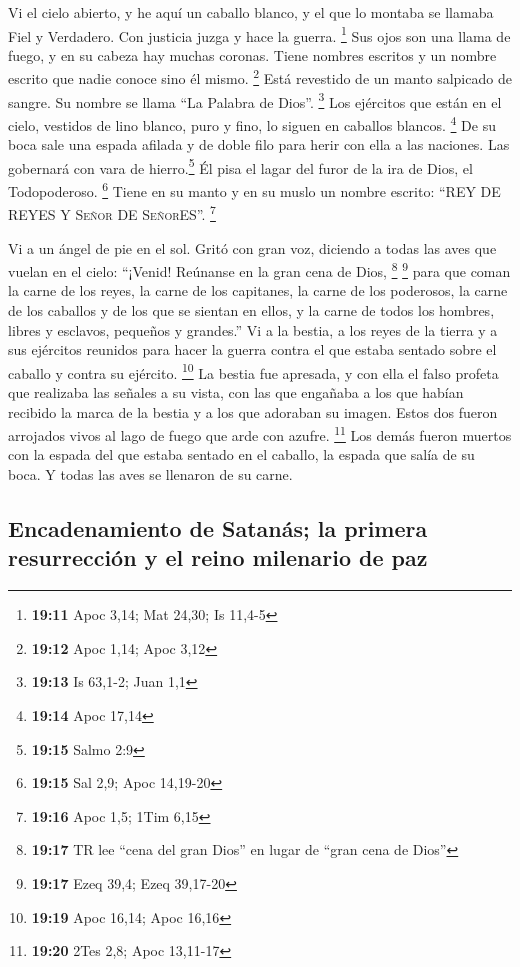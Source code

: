  Vi el cielo abierto, y he aquí un caballo blanco, y el
que lo montaba se llamaba Fiel y Verdadero. Con justicia juzga y hace la
guerra. \footnote{\textbf{19:11} Apoc 3,14; Mat 24,30; Is 11,4-5}
 Sus ojos son una llama de fuego, y en su cabeza hay
muchas coronas. Tiene nombres escritos y un nombre escrito que nadie
conoce sino él mismo. \footnote{\textbf{19:12} Apoc 1,14; Apoc 3,12}
 Está revestido de un manto salpicado de sangre. Su
nombre se llama ``La Palabra de Dios''. \footnote{\textbf{19:13} Is
  63,1-2; Juan 1,1}  Los ejércitos que están en el cielo,
vestidos de lino blanco, puro y fino, lo siguen en caballos blancos.
\footnote{\textbf{19:14} Apoc 17,14}  De su boca sale una
espada afilada y de doble filo para herir con ella a las naciones. Las
gobernará con vara de hierro.\footnote{\textbf{19:15} Salmo 2:9} Él pisa
el lagar del furor de la ira de Dios, el Todopoderoso. \footnote{\textbf{19:15}
  Sal 2,9; Apoc 14,19-20}  Tiene en su manto y en su
muslo un nombre escrito: ``REY DE REYES Y \textsc{Señor} DE
\textsc{Señor}ES''. \footnote{\textbf{19:16} Apoc 1,5; 1Tim 6,15}

 Vi a un ángel de pie en el sol. Gritó con gran voz,
diciendo a todas las aves que vuelan en el cielo: ``¡Venid! Reúnanse en
la gran cena de Dios, \footnote{\textbf{19:17} TR lee ``cena del gran
  Dios'' en lugar de ``gran cena de Dios''} \footnote{\textbf{19:17}
  Ezeq 39,4; Ezeq 39,17-20}  para que coman la carne de
los reyes, la carne de los capitanes, la carne de los poderosos, la
carne de los caballos y de los que se sientan en ellos, y la carne de
todos los hombres, libres y esclavos, pequeños y grandes.''
 Vi a la bestia, a los reyes de la tierra y a sus
ejércitos reunidos para hacer la guerra contra el que estaba sentado
sobre el caballo y contra su ejército. \footnote{\textbf{19:19} Apoc
  16,14; Apoc 16,16}  La bestia fue apresada, y con ella
el falso profeta que realizaba las señales a su vista, con las que
engañaba a los que habían recibido la marca de la bestia y a los que
adoraban su imagen. Estos dos fueron arrojados vivos al lago de fuego
que arde con azufre. \footnote{\textbf{19:20} 2Tes 2,8; Apoc 13,11-17}
 Los demás fueron muertos con la espada del que estaba
sentado en el caballo, la espada que salía de su boca. Y todas las aves
se llenaron de su carne.

\hypertarget{encadenamiento-de-satanuxe1s-la-primera-resurrecciuxf3n-y-el-reino-milenario-de-paz}{%
\subsection{Encadenamiento de Satanás; la primera resurrección y el
reino milenario de
paz}\label{encadenamiento-de-satanuxe1s-la-primera-resurrecciuxf3n-y-el-reino-milenario-de-paz}}

